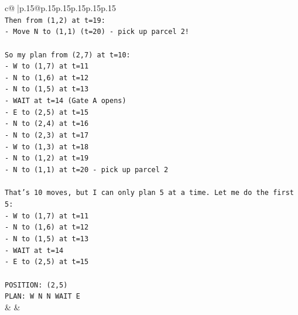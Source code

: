 \documentclass{article}
\begin{document}
{\begin{supertabular}{c@{$\;$}|p{.15\linewidth}@{}p{.15\linewidth}p{.15\linewidth}p{.15\linewidth}p{.15\linewidth}p{.15\linewidth}}
{{{\\ 
\texttt{Then from (1,2) at t=19:} \\
\texttt{{-} Move N to (1,1) (t=20) {-} pick up parcel 2!} \\
\\ 
\texttt{So my plan from (2,7) at t=10:} \\
\texttt{{-} W to (1,7) at t=11} \\
\texttt{{-} N to (1,6) at t=12} \\
\texttt{{-} N to (1,5) at t=13} \\
\texttt{{-} WAIT at t=14 (Gate A opens)} \\
\texttt{{-} E to (2,5) at t=15} \\
\texttt{{-} N to (2,4) at t=16} \\
\texttt{{-} N to (2,3) at t=17} \\
\texttt{{-} W to (1,3) at t=18} \\
\texttt{{-} N to (1,2) at t=19} \\
\texttt{{-} N to (1,1) at t=20 {-} pick up parcel 2} \\
\\ 
\texttt{That's 10 moves, but I can only plan 5 at a time. Let me do the first 5:} \\
\texttt{{-} W to (1,7) at t=11} \\
\texttt{{-} N to (1,6) at t=12} \\
\texttt{{-} N to (1,5) at t=13} \\
\texttt{{-} WAIT at t=14} \\
\texttt{{-} E to (2,5) at t=15} \\
\\ 
\texttt{POSITION: (2,5)} \\
\texttt{PLAN: W N N WAIT E} \\
            }
        }
    }
    & & \\ \\


\end{supertabular}}
\end{document}
